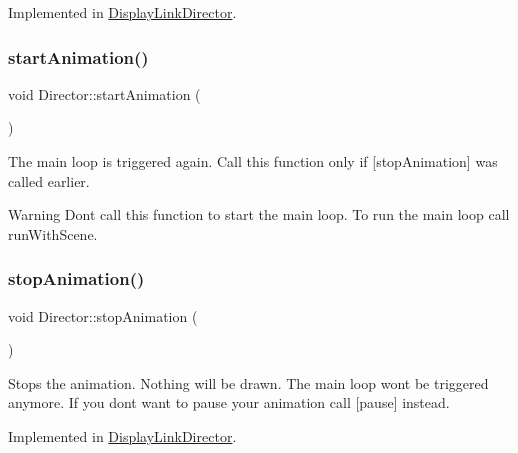 Implemented in \hyperlink{classDisplayLinkDirector_aed0e316ca8afa0b6e155a5257e3f9201}{Display\+Link\+Director}.

\mbox{\label{classDirector_ae194a51e690fc6e1a6334a6a83da5b2e}} 
\subsubsection{\texorpdfstring{start\+Animation()}{startAnimation()}\hspace{0.1cm}{\footnotesize\ttfamily [2/2]}}
{\footnotesize\ttfamily void Director\+::start\+Animation (\begin{DoxyParamCaption}{ }\end{DoxyParamCaption})}

The main loop is triggered again. Call this function only if \mbox{[}stop\+Animation\mbox{]} was called earlier. \begin{DoxyWarning}{Warning}
Don\textquotesingle{}t call this function to start the main loop. To run the main loop call run\+With\+Scene. 
\end{DoxyWarning}
\mbox{\label{classDirector_abe981a5c5d35aaf6c2aaf1b55f023e82}} 
\subsubsection{\texorpdfstring{stop\+Animation()}{stopAnimation()}\hspace{0.1cm}{\footnotesize\ttfamily [1/2]}}
{\footnotesize\ttfamily void Director\+::stop\+Animation (\begin{DoxyParamCaption}{ }\end{DoxyParamCaption})\hspace{0.3cm}{\ttfamily [pure virtual]}}

Stops the animation. Nothing will be drawn. The main loop won\textquotesingle{}t be triggered anymore. If you don\textquotesingle{}t want to pause your animation call \mbox{[}pause\mbox{]} instead. 

Implemented in \hyperlink{classDisplayLinkDirector_af3c6a2fbc71e733a9957e653c26c7798}{Display\+Link\+Director}.

\mbox{\label{classDirector_a436d0f15a1cf160cb72a64edc2df217c}} 
